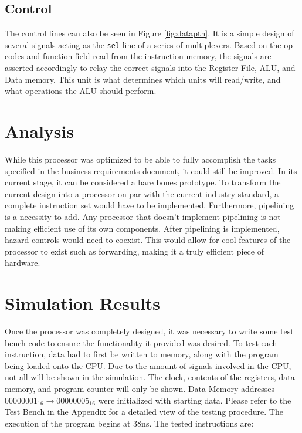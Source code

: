 \documentclass[12pt]{article}
\begin{document}
\subsection{Control}
The control lines can also be seen in Figure \ref{fig:datapth}. It is a simple design of several signals acting as the \texttt{sel} line of a series of multiplexers. Based on the op codes and function field read from the instruction memory, the signals are asserted accordingly to relay the correct signals into the Register File, ALU, and Data memory. This unit is what determines which units will read/write, and what operations the ALU should perform.
\section{Analysis}
While this processor was optimized to be able to fully accomplish the tasks specified in the business requirements document, it could still be improved. In its current stage, it can be considered a bare bones prototype. To transform the current design into a processor on par with the current industry standard, a complete instruction set would have to be implemented. Furthermore, pipelining is a necessity to add. Any processor that doesn't implement pipelining is not making efficient use of its own components. After pipelining is implemented, hazard controls would need to coexist. This would allow for cool features of the processor to exist such as forwarding, making it a truly efficient piece of hardware.
\section{Simulation Results}
Once the processor was completely designed, it was necessary to write some test bench code to ensure the functionality it provided was desired. To test each instruction, data had to first be written to memory, along with the program being loaded onto the CPU. Due to the amount of signals involved in the CPU, not all will be shown in the simulation. The clock, contents of the registers, data memory, and program counter will only be shown. Data Memory addresses $00000001_{16} \to 00000005_{16}$ were initialized with starting data. Please refer to the Test Bench in the Appendix for a detailed view of the testing procedure. The execution of the program begins at 38ns. The tested instructions are:
\end{document}

